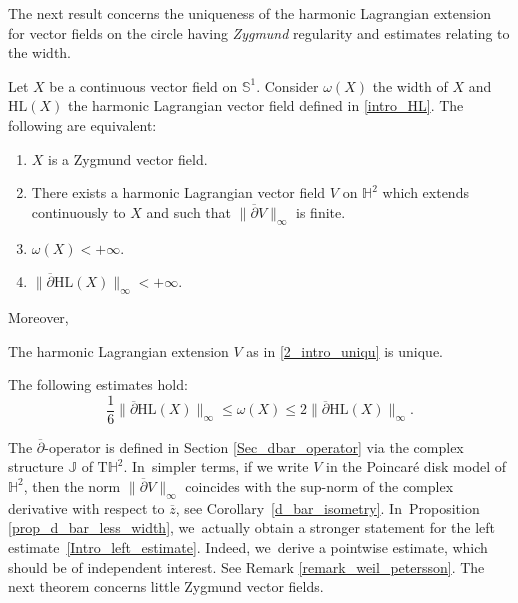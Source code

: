 The next result concerns the uniqueness of the harmonic Lagrangian extension for vector fields on the circle having \emph{Zygmund} regularity and estimates relating to the width.
\begin{theorem}\label{intro_uniqu_HL}
Let $X$ be a continuous vector field on $\mathbb{S}^1$. Consider $\omega(X)$ the width of $X$ and $\mathrm{HL}(X)$ the harmonic Lagrangian vector field defined in \eqref{intro_HL}. The following are equivalent:
\begin{enumerate}
\item \label{1_intro_uniqu} $X$ is a Zygmund vector field.
\item \label{2_intro_uniqu} There exists a harmonic Lagrangian vector field $V$ on $\mathbb{H}^2$ which extends continuously to $X$ and such that $\lVert\overline{\partial} V \rVert_{\infty}$ is finite.
\item \label{3_intro_uniqu} $\omega(X)<+\infty$.
\item \label{4_intro_uniqu} $\lVert \overline{\partial}\mathrm{HL}(X)\rVert_{\infty}<+\infty$.
\end{enumerate}
Moreover,
\begin{enumeratei}
\item\label{Moreover_i} The harmonic Lagrangian extension $V$ as in \eqref{2_intro_uniqu} is unique.
\item\label{Moreover_ii} The following estimates hold:
\begin{equation}\label{Intro_left_estimate}
\frac{1}{6}\lVert \overline{\partial} \mathrm{HL}(X)\rVert_{\infty} \leq \omega(X) \leq 2\lVert \overline{\partial} \mathrm{HL}(X) \rVert_{\infty}.
\end{equation}
\end{enumeratei}
\end{theorem}
The \(\overline{\partial}\)-operator is defined in Section \ref{Sec_dbar_operator} via the complex structure \(\mathbb{J}\) of \(\mathrm{T}\mathbb{H}^2\). In~simpler terms, if we write \(V\) in the Poincaré disk model of \(\mathbb{H}^2\), then the norm \(\lVert\overline{\partial} V \rVert_{\infty}\) coincides with the sup-norm of the complex derivative with respect to \(\overline{z}\), see Corollary~\ref{d_bar_isometry}. In~Proposition \ref{prop_d_bar_less_width}, we~actually obtain a stronger statement for the left estimate~\eqref{Intro_left_estimate}. Indeed, we~derive a pointwise estimate, which should be of independent interest. See Remark \ref{remark_weil_petersson}. The next theorem concerns little Zygmund vector fields.

